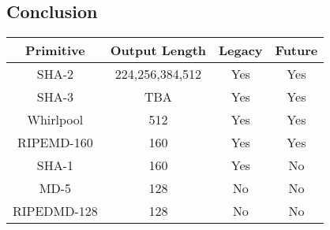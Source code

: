 \subsection{Conclusion}
\begin{table}
    \centering
    \begin{tabular}{c|c|c|c}
        Primitive & Output Length & Legacy & Future \\
        \hline
        SHA-2 & 224,256,384,512 & Yes & Yes \\
        SHA-3 & TBA & Yes & Yes \\
        Whirlpool & 512 & Yes & Yes \\
        \hline
        RIPEMD-160 & 160 & Yes & Yes \\
        SHA-1 & 160 & Yes & No \\
        \hline
        MD-5 & 128 & No & No \\
        RIPEDMD-128 & 128 & No & No \\
    \end{tabular}
\end{table}


